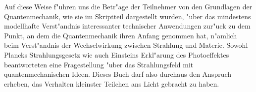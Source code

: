 Auf diese Weise f"uhren uns die Betr"age der Teilnehmer von den Grundlagen
der Quantenmechanik, wie sie im Skriptteil dargestellt wurden,
"uber das mindestens modellhafte Verst"andnis interessanter technischer
Anwendungen zur"uck zu dem Punkt, an dem die Quantenmechanik ihren
Anfang genommen hat, n"amlich beim Verst"andnis der Wechselwirkung
zwischen Strahlung und Materie. Sowohl Plancks Strahlungsgesetz wie
auch Einsteins Erkl"arung des Photoeffektes beantworteten eine Fragestellung
"uber das Strahlungsfeld mit quantenmechanischen Ideen.
Dieses Buch darf also durchaus den Anspruch erheben, das Verhalten kleinster
Teilchen ans Licht gebracht zu haben.

